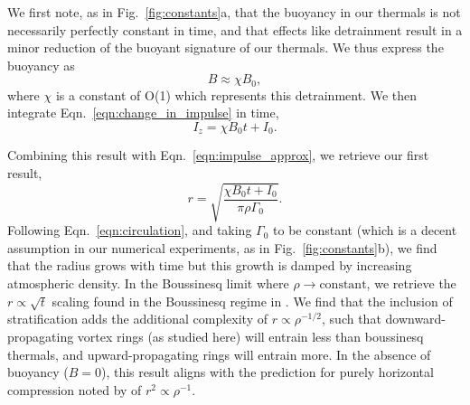 \documentclass[twocolumn, amsmath, amsfonts, amssymb, trackchanges]{aastex62}
\newcommand{\LJ}{\citetalias{lecoanet&jeevanjee2018}}
\begin{document}
We first note, as in Fig.~\ref{fig:constants}a, that the buoyancy in our thermals is not necessarily perfectly constant in time, and that effects like detrainment result in a minor reduction of the buoyant signature of our thermals. 
We thus express the buoyancy as 
\begin{equation}
B \approx \chi B_0,
\end{equation}
where $\chi$ is a constant of O(1) which represents this detrainment. 
We then integrate Eqn.~\ref{eqn:change_in_impulse} in time,
\begin{equation*}
I_z = \chi B_0 t + I_0.
\end{equation*}

Combining this result with Eqn.~\ref{eqn:impulse_approx}, we retrieve our first result,
\begin{equation}
r = \sqrt{\frac{\chi B_0 t + I_0}{\pi\rho\Gamma_0}}.
\label{eqn:r_theory}
\end{equation}
Following Eqn.~\ref{eqn:circulation}, and taking $\Gamma_0$ to be constant (which is a decent assumption in our numerical experiments, as in Fig.~\ref{fig:constants}b), we find that the radius grows with time but this growth is damped by increasing atmospheric density.
In the Boussinesq limit where $\rho \rightarrow \text{constant}$, we retrieve the $r \propto \sqrt{t}$ scaling found in the Boussinesq regime in \LJ. 
We find that the inclusion of stratification adds the additional complexity of $r \propto \rho^{-1/2}$, such that downward-propagating vortex rings (as studied here) will entrain less than boussinesq thermals, and upward-propagating rings will entrain more. 
In the absence of buoyancy ($B = 0$), this result aligns with the prediction for purely horizontal compression noted by \citet{brandenburg2016} of $r^2 \propto \rho^{-1}$.
\end{document}
